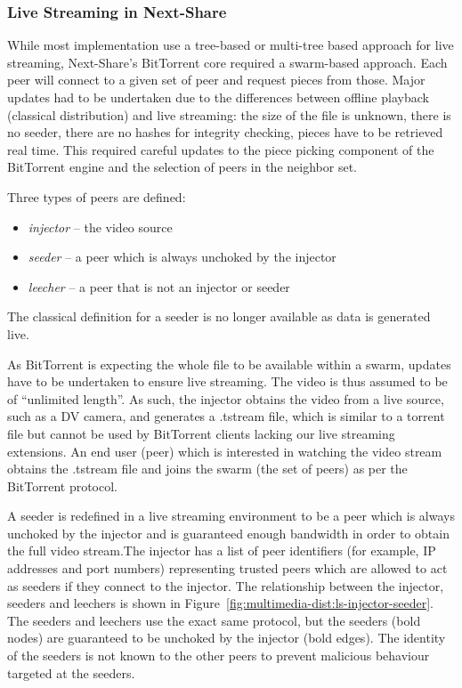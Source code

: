 \subsubsection{Live Streaming in Next-Share}

While most implementation use a tree-based or multi-tree based approach for
live streaming, Next-Share's BitTorrent core required a swarm-based approach.
Each peer will connect to a given set of peer and request pieces from those.
Major updates had to be undertaken due to the differences between offline
playback (classical distribution) and live streaming: the size of the file is
unknown, there is no seeder, there are no hashes for integrity checking,
pieces have to be retrieved real time. This required careful updates to the
piece picking component of the BitTorrent engine and the selection of peers in
the neighbor set.

Three types of peers are defined:
\begin{itemize}
  \item \textit{injector} -- the video source
  \item \textit{seeder} -- a peer which is always unchoked by the injector
  \item \textit{leecher} -- a peer that is not an injector or seeder
\end{itemize}

The classical definition for a seeder is no longer available as data is
generated live.

As BitTorrent is expecting the whole file to be available within a swarm,
updates have to be undertaken to ensure live streaming. The video is thus
assumed to be of ``unlimited length''. As such, the injector obtains the
video from a live source, such as a DV camera, and generates a .tstream file,
which is similar to a torrent file but cannot be used by BitTorrent clients
lacking our live streaming extensions. An end user (peer) which is interested
in watching the video stream obtains the .tstream file and joins the swarm
(the set of peers) as per the BitTorrent protocol.

A seeder is redefined in a live streaming environment to be a peer which is
always unchoked by the injector and is guaranteed enough bandwidth in order to
obtain the full video stream.The injector has a list of peer identifiers (for
example, IP addresses and port numbers) representing trusted peers which are
allowed to act as seeders if they connect to the injector. The relationship
between the injector, seeders and leechers is shown in
Figure~\ref{fig:multimedia-dist:ls-injector-seeder}. The seeders and leechers use the exact
same protocol, but the seeders (bold nodes) are guaranteed to be unchoked by
the injector (bold edges). The identity of the seeders is not known to the
other peers to prevent malicious behaviour targeted at the seeders.


